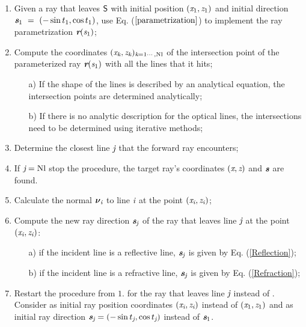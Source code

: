 \begin{enumerate}
 \item Given a ray that leaves $\textsf{S}$ with initial position $(\textit{x}_1, \textit{z}_1)$ and initial direction $\textit{\textbf{s}}_1~=~(-\sin t_1, \cos t_1)$, use Eq. ($\ref{parametrization}$) to implement the ray parametrization $\textit{\textbf{r}}(\textit{s}_1)$;
\item Compute the coordinates $(\textit{x}_{\textit{k}}, \textit{z}_{\textit{k}})_{\textit{k} = 1\cdots, \textrm{Nl}}$ of the intersection point of the parameterized ray $\textit{\textbf{r}}(\textit{s}_1)$ with all the lines that it hits;
\begin{itemize}
\item[a)] If the shape of the lines is described by an analytical equation, the intersection points are determined analytically;
\item[b)] If there is no analytic description for the optical lines, the intersections need to be determined using iterative methods;
\end{itemize}
\item  Determine the closest line $\textit{j}$ that the forward ray encounters;
\item If $\textit{j} = \textrm{Nl}$ stop the procedure, the target ray's coordinates $(\textit{x}, \textit{z})$ and $\textit{\textbf{s}}$ are found.
\item Calculate the normal $\boldsymbol{\nu}_{\textit{i}}$ to line $\textit{i}$ at the point $(\textit{x}_{\textit{i}}, \textit{z}_{\textit{i}})$;
 \item Compute the new ray direction $\textit{\textbf{s}}_{\textit{j}}$ of the ray that leaves line $\textit{j}$ at the point $(\textit{x}_{\textit{i}}, \textit{z}_{\textit{i}})$:
\begin{itemize}
\item[a)] if the incident line is a reflective line, $\textit{\textbf{s}}_{\textit{j}}$ is given by Eq. (\ref{Reflection});
\item[b)] if the incident line is a refractive line, $\textit{\textbf{s}}_{\textit{j}}$ is given by Eq. (\ref{Refraction});
\end{itemize}
\item Restart the procedure from $1.$ for the ray that leaves line $\textit{j}$ instead of . Consider as initial ray position coordinates $(\textit{x}_{\textit{i}}, \textit{z}_{\textit{i}})$ instead of $(\textit{x}_1, \textit{z}_1)$ and as initial ray direction $\textit{\textbf{s}}_{\textit{j}}= (-\sin t_{\textit{j}}, \cos t_{\textit{j}})$ instead of $\textit{\textbf{s}}_1$.
\end{enumerate}
